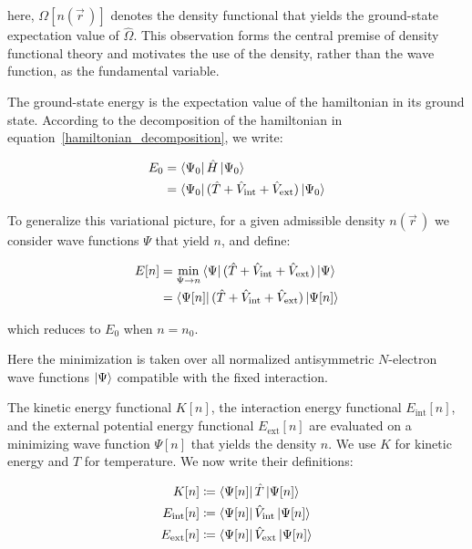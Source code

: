 here, $\Omega[n(\vec{r}\,)]$ denotes the density functional that yields the ground-state expectation value of $\hat{\Omega}$.
This observation forms the central premise of density functional theory and motivates the use of the density, rather than the wave function, as the fundamental variable.

The ground-state energy is the expectation value of the hamiltonian in its ground state.
According to the decomposition of the hamiltonian in equation~\eqref{hamiltonian_decomposition}, we write:

\begin{equation}
\begin{aligned}
    E_0
    &= \bra{\Psi_0}\hat{H}\ket{\Psi_0} \\
    &= \bra{\Psi_0}(\hat{T}+\hat{V}_\mathrm{int}+\hat{V}_\mathrm{ext})\ket{\Psi_0}
\end{aligned}
\label{groundstate_energy_decomposition}
\end{equation}

To generalize this variational picture, for a given admissible density $n(\vec{r}\,)$ we consider wave functions $\Psi$ that yield $n$, and define:

\begin{equation}
\begin{aligned}
    E[n]
    &= \min_{\Psi\to n}\bra{\Psi}(\hat{T}+\hat{V}_\mathrm{int}+\hat{V}_\mathrm{ext})\ket{\Psi} \\
    &= \bra{\Psi[n]}(\hat{T}+\hat{V}_\mathrm{int}+\hat{V}_\mathrm{ext})\ket{\Psi[n]}
\end{aligned}
\label{functional_energy_constrained_search}
\end{equation}

which reduces to $E_0$ when $n=n_0$.

Here the minimization is taken over all normalized antisymmetric $N$-electron wave functions $\ket{\Psi}$ compatible with the fixed interaction.

The kinetic energy functional $K[n]$, the interaction energy functional $E_\mathrm{int}[n]$, and the external potential energy functional $E_\mathrm{ext}[n]$ are evaluated on a minimizing wave function $\Psi[n]$ that yields the density $n$.
We use $K$ for kinetic energy and $T$ for temperature.
We now write their definitions:

\begin{equation}
\begin{aligned}
    K[n]&\coloneqq\bra{\Psi[n]}\hat{T}\ket{\Psi[n]} \\
    E_\mathrm{int}[n]&\coloneqq\bra{\Psi[n]}\hat{V}_\mathrm{int}\ket{\Psi[n]} \\
    E_\mathrm{ext}[n]&\coloneqq\bra{\Psi[n]}\hat{V}_\mathrm{ext}\ket{\Psi[n]}
\end{aligned}
\label{functional_T_Eint_Eext_definition}
\end{equation}

